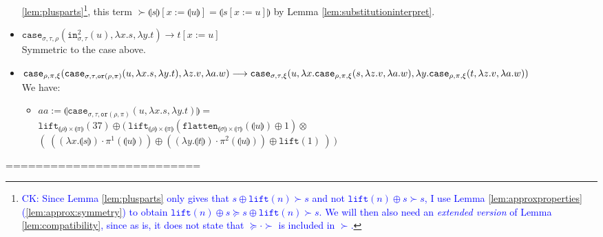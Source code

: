 \documentclass[runningheads,a4paper]{llncs}
\newcommand{\typeinterpret}[1]{\llparenthesis #1 \rrparenthesis}
\newcommand{\interpret}[1]{\llparenthesis #1 \rrparenthesis}
\newcommand{\red}{\longrightarrow}
\newcommand{\abs}[2]{\lambda #1.#2}
\newcommand{\proj}{\pi}
\newcommand{\flatten}{\mathtt{flatten}}
\newcommand{\lift}{\mathtt{lift}}
\newcommand{\CK}[1]{\textcolor{blue}{CK: #1}}
\begin{document}
\begin{itemize}
  \ref{lem:plusparts}\footnote{\CK{Since Lemma
  \ref{lem:plusparts} only gives that $s \oplus \lift(n) \succ s$ and
  not $\lift(n) \oplus s \succ s$, I use Lemma
  \ref{lem:approxproperties}(\ref{lem:approx:symmetry}) to obtain
  $\lift(n) \oplus s \succeq s \oplus \lift(n) \succ s$.  We will
  then also need an \emph{extended version} of Lemma
  \ref{lem:compatibility}, since as is, it does not state that
  $\succeq \cdot \succ$ is included in $\succ$.}}, this term
  $\succ \interpret{s}[x:=\interpret{u}] = \interpret{s[x:=u]}$ by
  Lemma \ref{lem:substitutioninterpret}.
\item $\mathtt{case}_{\sigma,\tau,\rho}(\mathtt{in}^2_{\sigma,\tau}(u),
  \abs{x}{s},\abs{y}{t}) \red t[x:=u]$ \\
  Symmetric to the case above.
\item $
\mathtt{case}_{\rho,\pi,\xi}(\mathtt{case}_{\sigma,\tau,\mathtt{or}(
  \rho,\pi)}(u,\abs{x}{s},\abs{y}{t}),\abs{z}{v},\abs{a}{w}) %
  \red\\
  \mathtt{case}_{\sigma,\tau,\xi}(u,
    \abs{x}{\mathtt{case}_{\rho,\pi,\xi}(s,\abs{z}{v},\abs{a}{w})},
    \abs{y}{\mathtt{case}_{\rho,\pi,\xi}(t,\abs{z}{v},\abs{a}{w})}) $\\
  We have:
  \begin{itemize}
  \item $aa := \interpret{\mathtt{case}_{\sigma,\tau,\mathtt{or}(\rho,
    \pi)}(u,\abs{x}{s},\abs{y}{t})} =$\\$
    \lift_{\typeinterpret{\rho} \times \typeinterpret{\pi}}(37) \oplus
    (\ \lift_{\typeinterpret{\rho} \times \typeinterpret{\pi}}(
      \flatten_{\typeinterpret{\sigma} \times \typeinterpret{\tau}}(
        \interpret{u}) \oplus 1) \otimes$ \\
    \phantom{x} \hfill
    $(\ ((\abs{x}{\interpret{s}}) \cdot \proj^1(\interpret{u})) \oplus
    ((\abs{y}{\interpret{t}}) \cdot \proj^2(\interpret{u})) \oplus
    \lift(1)\ )\ )$
  \end{itemize}
\end{itemize}

==========================
\end{document}
